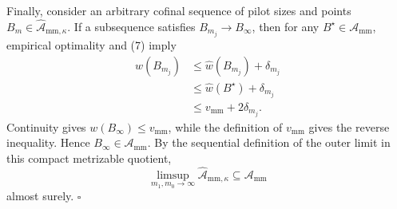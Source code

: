 Finally, consider an arbitrary cofinal sequence of pilot sizes and points \(B_m\in\widehat{\mathcal A}_{\mathrm{mm},\kappa}\).  If a subsequence satisfies \(B_{m_j}\to B_\infty\), then for any \(B^\star\in\mathcal A_{\mathrm{mm}}\), empirical optimality and (7) imply
\[
 \begin{aligned}
 w(B_{m_j})
 &\le \widehat w(B_{m_j})+\delta_{m_j}\\
 &\le \widehat w(B^\star)+\delta_{m_j}\\
 &\le v_{\mathrm{mm}}+2\delta_{m_j}.
 \end{aligned}
\]
Continuity gives \(w(B_\infty)\le v_{\mathrm{mm}}\), while the definition of \(v_{\mathrm{mm}}\) gives the reverse inequality.  Hence \(B_\infty\in\mathcal A_{\mathrm{mm}}\).  By the sequential definition of the outer limit in this compact metrizable quotient,
\[
 \limsup_{m_1,m_0\to\infty}\widehat{\mathcal A}_{\mathrm{mm},\kappa}
 \subseteq\mathcal A_{\mathrm{mm}}
\]
almost surely. \(\square\)